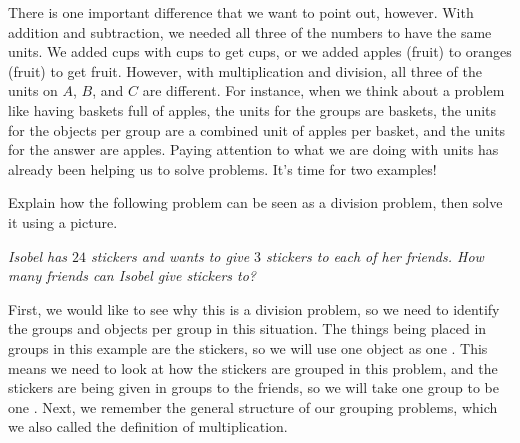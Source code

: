 \documentclass{ximera}
\begin{document}
There is one important difference that we want to point out, however. With addition and subtraction, we needed all three of the numbers to have the same units. We added cups with cups to get cups, or we added apples (fruit) to oranges (fruit) to get fruit. However, with multiplication and division, all three of the units on $A$, $B$, and $C$ are different. For instance, when we think about a problem like having baskets full of apples, the units for the groups are baskets, the units for the objects per group are a combined unit of apples per basket, and the units for the answer are apples. Paying attention to what we are doing with units has already been helping us to solve problems. It's time for two examples!

\begin{example}
Explain how the following problem can be seen as a division problem, then solve it using a picture. 

\emph{Isobel has $24$ stickers and wants to give $3$ stickers to each of her friends. How many friends can Isobel give stickers to?}

First, we would like to see why this is a division problem, so we need to identify the groups and objects per group in this situation. The things being placed in groups in this example are the stickers, so we will use one object as one . This means we need to look at how the stickers are grouped in this problem, and the stickers are being given in groups to the friends, so we will take one group to be one . Next, we remember the general structure of our grouping problems, which we also called the definition of multiplication.
\begin{image}
\end{image}


\end{example}
\end{document}
